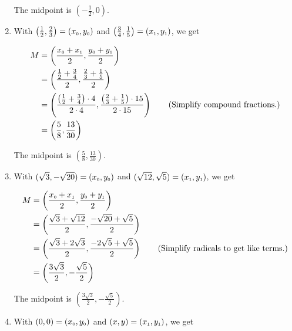 \begin{ex}
\begin{enumerate}
The midpoint is  $\left(- \frac{1}{2}, 0 \right)$.  

\item With $\left( \frac{1}{2}, \frac{2}{3}\right) =  \left(x_{\mbox{\tiny$0$}}, y_{\mbox{\tiny$0$}}\right)$ and  $\left( \frac{3}{4}, \frac{1}{5}\right) = \left(x_{\mbox{\tiny$1$}}, y_{\mbox{\tiny$1$}}\right)$, we get

\setlength{\extrarowheight}{10pt}

\begin{align*}
 M & = \left( \dfrac{x_{\mbox{\tiny$0$}}+x_{\mbox{\tiny$1$}}}{2},  \dfrac{y_{\mbox{\tiny$0$}}+y_{\mbox{\tiny$1$}}}{2} \right) \\
   & = \left( \dfrac{\frac{1}{2} + \frac{3}{4}}{2},  \dfrac{\frac{2}{3} + \frac{1}{5}}{2} \right)   \\
   & =  \left( \dfrac{\left(\frac{1}{2} + \frac{3}{4}\right) \cdot 4}{2 \cdot 4},  \dfrac{\left(\frac{2}{3} + \frac{1}{5}\right) \cdot 15}{2 \cdot 15} \right) \tag{Simplify compound fractions.} \\ 
   & = \left(\dfrac{5}{8}, \dfrac{13}{30} \right) 
\end{align*}
   
   

The midpoint is $\left(\frac{5}{8}, \frac{13}{30} \right)$.

\item   With $(\sqrt{3}, -\sqrt{20}) =  \left(x_{\mbox{\tiny$0$}}, y_{\mbox{\tiny$0$}}\right)$ and  $(\sqrt{12}, \sqrt{5}) = \left(x_{\mbox{\tiny$1$}}, y_{\mbox{\tiny$1$}}\right)$, we get

\setlength{\extrarowheight}{10pt}

\begin{align*}
 M & = \left( \dfrac{x_{\mbox{\tiny$0$}}+x_{\mbox{\tiny$1$}}}{2},  \dfrac{y_{\mbox{\tiny$0$}}+y_{\mbox{\tiny$1$}}}{2} \right) \\
   & = \left( \dfrac{\sqrt{3} + \sqrt{12}}{2},  \dfrac{-\sqrt{20}+\sqrt{5}}{2} \right) \\
   & =  \left( \dfrac{\sqrt{3}+2\sqrt{3}}{2},  \dfrac{-2\sqrt{5} + \sqrt{5}}{2} \right) \tag{Simplify radicals to get like terms.} \\ 
   & = \left(\dfrac{3\sqrt{3}}{2}, -\dfrac{\sqrt{5}}{2} \right)
\end{align*}
   
   The midpoint is $\left(\frac{3\sqrt{3}}{2}, -\frac{\sqrt{5}}{2} \right)$.

\item With $(0,0) =  \left(x_{\mbox{\tiny$0$}}, y_{\mbox{\tiny$0$}}\right)$ and  $(x,y) = \left(x_{\mbox{\tiny$1$}}, y_{\mbox{\tiny$1$}}\right)$, we get


\end{enumerate}
\end{ex}
